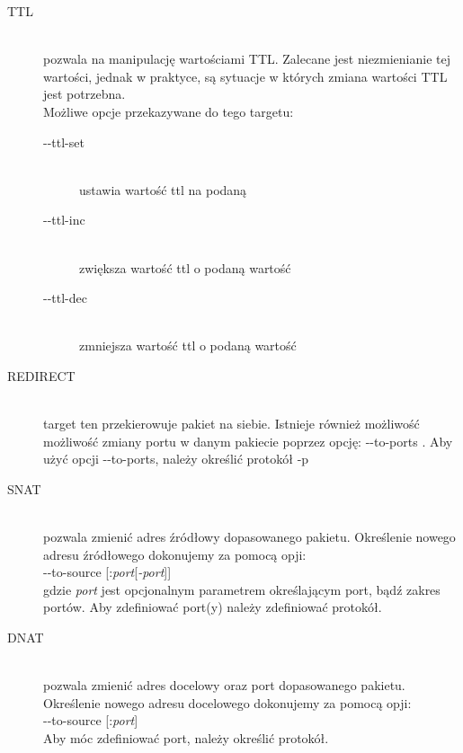 \begin{description}
				\item[TTL] \hfill \\
					pozwala na manipulację wartościami TTL. Zalecane jest niezmienianie tej wartości, jednak w praktyce, są sytuacje w których zmiana wartości TTL jest potrzebna.\\
					Możliwe opcje przekazywane do tego targetu:
					\begin{description}
						\item[-{}-ttl-set ] \hfill \\
							ustawia wartość ttl na podaną
						\item[-{}-ttl-inc ] \hfill \\
							zwiększa wartość ttl o podaną wartość
						\item[-{}-ttl-dec ] \hfill \\
							zmniejsza wartość ttl o podaną wartość
					\end{description}
				\item[REDIRECT] \hfill \\
					target ten przekierowuje pakiet na siebie. Istnieje również możliwość możliwość zmiany portu w danym pakiecie poprzez opcję: -{}-to-ports .
					Aby użyć opcji -{}-to-ports, należy określić protokół -p 
				\item[SNAT] \hfill \\
					pozwala zmienić adres źródłowy dopasowanego pakietu. Określenie nowego adresu źródłowego dokonujemy za pomocą opji:\\
					-{}-to-source  [:\textit{port}[\textit{-port}]]\\
					gdzie \textit{port} jest opcjonalnym parametrem określającym port, bądź zakres portów. Aby zdefiniować port(y) należy zdefiniować protokół.
				\item[DNAT] \hfill \\
					pozwala zmienić adres docelowy oraz port dopasowanego pakietu. Określenie nowego adresu docelowego dokonujemy za pomocą opji:\\
					-{}-to-source  [:\textit{port}]\\
					Aby móc zdefiniować port, należy określić protokół.
			\end{description}

